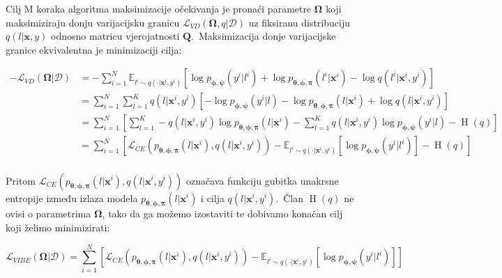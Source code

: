 \documentclass[diplomskirad]{fer}
\begin{document}
Cilj M koraka algoritma maksimizacije očekivanja je pronaći parametre $\bm{\Omega}$ koji maksimiziraju donju varijacijsku granicu $\mathcal{L}_{VD}(\bm{\Omega}, q | \mathcal{D})$ uz fiksiranu distribuciju $q(l | \bm{x}, y)$ odnosno matricu vjerojatnosti $\bm{Q}$.\ 
Maksimizacija donje varijacijske granice ekvivalentna je minimizaciji cilja:

\begin{equation}
  \begin{aligned}
    -\mathcal{L}_{VD}(\bm{\Omega}|\mathcal{D}) &= -\sum_{i=1}^{N} \mathbb{E}_{l^i \sim q(\cdot | \bm{x}^i, y^i)} \left[\log p_{\bm{\phi}, \bm{\psi}}(y^i | l^i) + \log p_{\bm{\theta}, \bm{\phi}, \bm{\pi}}(l^i | \bm{x}^i) - \log q(l^i | \bm{x}^i, y^i) \right] \\
                                               &= \sum_{i=1}^{N} \sum_{l=1}^{K} q(l | \bm{x}^i, y^i) \left[-\log p_{\bm{\phi}, \bm{\psi}}(y^i | l) - \log p_{\bm{\theta}, \bm{\phi}, \bm{\pi}}(l | \bm{x}^i) + \log q(l | \bm{x}^i, y^i) \right] \\
                                               &= \sum_{i=1}^{N} \left[ \sum_{l=1}^{K} -q(l | \bm{x}^i, y^i) \log p_{\bm{\theta}, \bm{\phi}, \bm{\pi}}(l | \bm{x}^i) - \sum_{l=1}^{K} q(l | \bm{x}^i, y^i) \log p_{\bm{\phi}, \bm{\psi}}(y^i | l) - \operatorname{H}(q) \right] \\
                                               &= \sum_{i=1}^{N} \left[ \mathcal{L}_{CE} (p_{\bm{\theta}, \bm{\phi}, \bm{\pi}}(l | \bm{x}^i), q(l | \bm{x}^i, y^i)) - \mathbb{E}_{l^i \sim q(\cdot | \bm{x}^i, y^i)} \left[ \log p_{\bm{\phi}, \bm{\psi}}(y^i | l^i) \right] - \operatorname{H}(q) \right] \\
  \end{aligned}
  \label{eq:vibe_m_step_init}
\end{equation}

Pritom $\mathcal{L}_{CE} (p_{\bm{\theta}, \bm{\phi}, \bm{\pi}}(l | \bm{x}^i), q(l | \bm{x}^i, y^i))$ označava funkciju gubitka unakrsne entropije između izlaza modela $p_{\bm{\theta}, \bm{\phi}, \bm{\pi}}(l | \bm{x}^i)$ i cilja $q(l | \bm{x}^i, y^i)$.\ 
Član $\operatorname{H}(q)$ ne ovisi o parametrima $\bm{\Omega}$, tako da ga možemo izostaviti te dobivamo konačan cilj koji želimo minimizirati:

\begin{equation}
  \mathcal{L}_{VIBE}(\bm{\Omega} | \mathcal{D}) = \sum_{i=1}^{N} \left[ \mathcal{L}_{CE} (p_{\bm{\theta}, \bm{\phi}, \bm{\pi}}(l | \bm{x}^i), q(l | \bm{x}^i, y^i)) - \mathbb{E}_{l^i \sim q(\cdot | \bm{x}^i, y^i)} \left[ \log p_{\bm{\phi}, \bm{\psi}}(y^i | l^i) \right] \right]
  \label{eq:vibe_m_step_final}
\end{equation}
\end{document}

